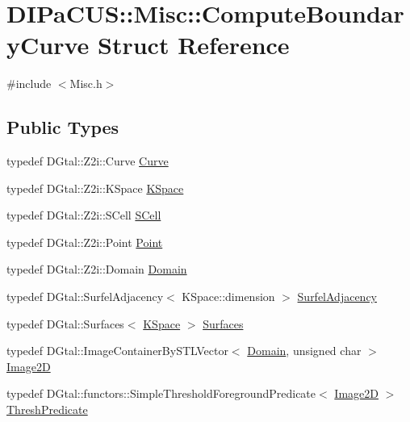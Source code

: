 \hypertarget{structDIPaCUS_1_1Misc_1_1ComputeBoundaryCurve}{}\section{D\+I\+Pa\+C\+US\+:\+:Misc\+:\+:Compute\+Boundary\+Curve Struct Reference}
\label{structDIPaCUS_1_1Misc_1_1ComputeBoundaryCurve}


{\ttfamily \#include $<$Misc.\+h$>$}

\subsection*{Public Types}
\begin{DoxyCompactItemize}
\item 
typedef D\+Gtal\+::\+Z2i\+::\+Curve \mbox{\hyperlink{structDIPaCUS_1_1Misc_1_1ComputeBoundaryCurve_ac3d7adcd3d9b37d2166c65346e0916d2}{Curve}}
\item 
typedef D\+Gtal\+::\+Z2i\+::\+K\+Space \mbox{\hyperlink{structDIPaCUS_1_1Misc_1_1ComputeBoundaryCurve_acc6e92e432a70c87e062e3beef65953b}{K\+Space}}
\item 
typedef D\+Gtal\+::\+Z2i\+::\+S\+Cell \mbox{\hyperlink{structDIPaCUS_1_1Misc_1_1ComputeBoundaryCurve_affd97ae2b7fea729fca28c9a4bb16fd5}{S\+Cell}}
\item 
typedef D\+Gtal\+::\+Z2i\+::\+Point \mbox{\hyperlink{structDIPaCUS_1_1Misc_1_1ComputeBoundaryCurve_a32066ce33f46a6f384cfe87ff62243d0}{Point}}
\item 
typedef D\+Gtal\+::\+Z2i\+::\+Domain \mbox{\hyperlink{structDIPaCUS_1_1Misc_1_1ComputeBoundaryCurve_a7adb0e563e32b1096bde9f5a136e6cbc}{Domain}}
\item 
typedef D\+Gtal\+::\+Surfel\+Adjacency$<$ K\+Space\+::dimension $>$ \mbox{\hyperlink{structDIPaCUS_1_1Misc_1_1ComputeBoundaryCurve_aa06c85b92e3bd9660c70f25cccd0ffe1}{Surfel\+Adjacency}}
\item 
typedef D\+Gtal\+::\+Surfaces$<$ \mbox{\hyperlink{structDIPaCUS_1_1Misc_1_1ComputeBoundaryCurve_acc6e92e432a70c87e062e3beef65953b}{K\+Space}} $>$ \mbox{\hyperlink{structDIPaCUS_1_1Misc_1_1ComputeBoundaryCurve_ad6763f5050153634ba8e78e7ed0a8344}{Surfaces}}
\item 
typedef D\+Gtal\+::\+Image\+Container\+By\+S\+T\+L\+Vector$<$ \mbox{\hyperlink{structDIPaCUS_1_1Misc_1_1ComputeBoundaryCurve_a7adb0e563e32b1096bde9f5a136e6cbc}{Domain}}, unsigned char $>$ \mbox{\hyperlink{structDIPaCUS_1_1Misc_1_1ComputeBoundaryCurve_a67511f091a6fb85b38f29a4df3f480dd}{Image2D}}
\item 
typedef D\+Gtal\+::functors\+::\+Simple\+Threshold\+Foreground\+Predicate$<$ \mbox{\hyperlink{structDIPaCUS_1_1Misc_1_1ComputeBoundaryCurve_a67511f091a6fb85b38f29a4df3f480dd}{Image2D}} $>$ \mbox{\hyperlink{structDIPaCUS_1_1Misc_1_1ComputeBoundaryCurve_af7d6bf815acb40e8ae7e99c418d94b30}{Thresh\+Predicate}}
\end{DoxyCompactItemize}
